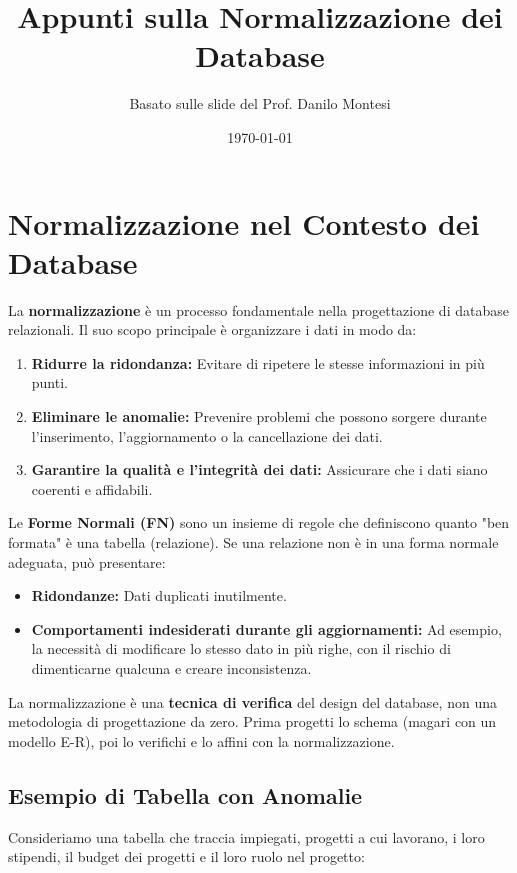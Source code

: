 \documentclass{article}
\title{Appunti sulla Normalizzazione dei Database}
\author{Basato sulle slide del Prof. Danilo Montesi}
\date{\today}
\begin{document}
	
	\maketitle
	\tableofcontents
	\newpage
	
	\section{Normalizzazione nel Contesto dei Database}
	
	La \textbf{normalizzazione} è un processo fondamentale nella progettazione di database relazionali. Il suo scopo principale è organizzare i dati in modo da:
	\begin{enumerate}
		\item \textbf{Ridurre la ridondanza:} Evitare di ripetere le stesse informazioni in più punti.
		\item \textbf{Eliminare le anomalie:} Prevenire problemi che possono sorgere durante l'inserimento, l'aggiornamento o la cancellazione dei dati.
		\item \textbf{Garantire la qualità e l'integrità dei dati:} Assicurare che i dati siano coerenti e affidabili.
	\end{enumerate}
	
	Le \textbf{Forme Normali (FN)} sono un insieme di regole che definiscono quanto "ben formata" è una tabella (relazione). Se una relazione non è in una forma normale adeguata, può presentare:
	\begin{itemize}
		\item \textbf{Ridondanze:} Dati duplicati inutilmente.
		\item \textbf{Comportamenti indesiderati durante gli aggiornamenti:} Ad esempio, la necessità di modificare lo stesso dato in più righe, con il rischio di dimenticarne qualcuna e creare inconsistenza.
	\end{itemize}
	
	La normalizzazione è una \textbf{tecnica di verifica} del design del database, non una metodologia di progettazione da zero. Prima progetti lo schema (magari con un modello E-R), poi lo verifichi e lo affini con la normalizzazione.
	
	\subsection{Esempio di Tabella con Anomalie}
	Consideriamo una tabella che traccia impiegati, progetti a cui lavorano, i loro stipendi, il budget dei progetti e il loro ruolo nel progetto:
	
\end{document}
